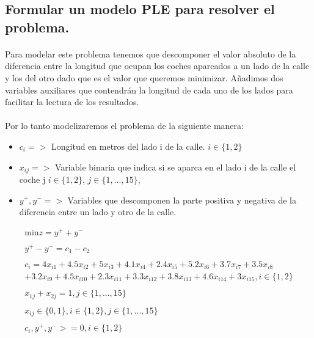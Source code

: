 \documentclass[10pt, a4paper]{article}
\begin{document}
		\subsection{Formular un modelo PLE para resolver el problema.}

			\paragraph{}
			Para modelar este problema tenemos que descomponer el valor absoluto de la diferencia entre la longitud que ocupan los coches aparcados a un lado de la calle y los del otro dado que es el valor que queremos minimizar. Añadimos dos variables auxiliares que contendrán la longitud de cada uno de los lados para facilitar la lectura de los resultados.

			\paragraph{}
			Por lo tanto modelizaremos el problema de la siguiente manera:

			\begin{itemize}
				\item \(c_{i} => \) Longitud en metros del lado i de la calle. $i \in \{1,2\}$

				\item \(x_{ij} => \) Variable binaria que indica si se aparca en el lado i de la calle el coche j  $i \in \{1,2\}$, $j \in \{1,...,15\}$,

				\item \(y^{+}, y^{-} => \) Variables que descomponen la parte positiva y negativa de la diferencia entre un lado y otro de la calle.
			\end{itemize}

			\[
				\begin{split}
					\text{min} z = y^{+} + y^{-} \\ \\
						y^{+} - y^{-} = c_1 - c_2 \\ \\
						c_i = 4x_{i1} + 4.5x_{i2} + 5x_{i3} + 4.1x_{i4} + 2.4x_{i5} + 5.2x_{i6} + 3.7x_{i7} + 3.5x_{i8} \\
						+ 3.2x_{i9} + 4.5x_{i10} + 2.3x_{i11} + 3.3x_{i12} + 3.8x_{i13} + 4.6x_{i14} + 3x_{i15}, i \in \{1,2\}\\ \\
						x_{1j} + x_{2j} = 1, j \in \{1,...,15\} \\ \\
						x_{ij} \in \{0,1\}, i \in \{1,2\},j \in \{1,...,15\} \\ \\
						c_{i}, y^{+}, y^{-} >= 0, i \in \{1,2\}\\ \\
				\end{split}
			\]
\end{document}
